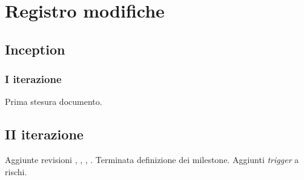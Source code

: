 \documentclass[10pt]{softeng}
\begin{document}
\startofdocument

\clearpage







\clearpage



\clearpage



\clearpage

\section{Registro modifiche}

\subsection{Inception}

\subsubsection{I iterazione}

Prima stesura documento.

\subsection{II iterazione}

Aggiunte revisioni , , , .
Terminata definizione dei milestone.
Aggiunti \emph{trigger} a rischi.
\end{document}
